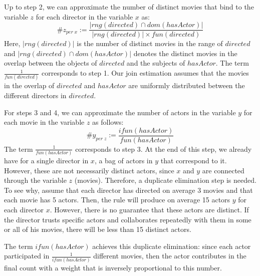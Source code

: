 {Up to step 2, we can approximate the number of distinct movies that bind to the variable $z$ for each director in the variable $x$ as:
$$
\#z_{per \; x} := \frac{|rng(directed) \cap dom(hasActor)|}{|rng(directed)| \times fun(directed)}
$$
Here, $|rng(directed)|$ is the number of distinct movies in the range of $directed$ and $|rng(directed) \cap dom(hasActor)|$
denotes the distinct movies in the overlap between the objects of $directed$ and the subjects of $hasActor$.
The term $\frac{1}{fun(directed)}$ corresponds to step  1.
Our join estimation assumes that the movies in the overlap of $directed$
and $hasActor$ are uniformly distributed between the different directors in $directed$.

For steps 3 and 4, we can approximate the number of actors in the variable $y$ for each movie in the variable $z$ as follows:
$$
\#y_{ per \; z} := \frac{ifun(hasActor)}{fun(hasActor)}
$$
The term $\frac{1}{fun(hasActor)}$ corresponds to step 3. At the end of this step,
we already have for a single director in $x$, a bag of actors in $y$ that correspond to it.
However, these are not necessarily distinct actors, since $x$ and $y$ are connected through the variable $z$ (movies). Therefore, a duplicate elimination step is needed.
To see why, assume that each director has directed on average 3 movies and that each movie has 5 actors. Then, the rule will produce on average 15 actors $y$ for each director $x$.
However, there is no guarantee that these actors are distinct.
If the director trusts specific actors and collaborates repeatedly with them in some or all of his movies, there will be less than 15 distinct actors.



The term $ifun(hasActor)$ achieves this duplicate elimination:
since each actor participated in $\frac{1}{ifun(hasActor)}$ different movies, then the actor
contributes in the final count with a weight that is inversely proportional to this number.


}
